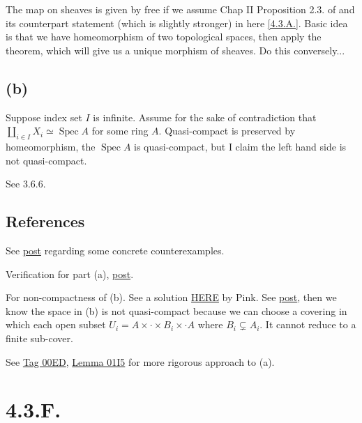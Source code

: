The map on sheaves is given by free if we assume Chap II Proposition 2.3. of \cite{hartshorne2013algebraic} and its counterpart statement (which is slightly stronger) in here \ref{4.3.A.}. Basic idea is that we have homeomorphism of two topological spaces, then apply the theorem, which will give us a unique morphism of sheaves. Do this conversely...

\subsection{(b)}

Suppose index set $I$ is infinite. Assume for the sake of contradiction that $\amalg_{i\in I}X_i\simeq \operatorname{Spec}A$ for some ring $A$. Quasi-compact is preserved by homeomorphism, the $\operatorname{Spec}A$ is quasi-compact, but I claim the left hand side is not quasi-compact. 

See 3.6.6.

\subsection{References}

See \href{https://math.stackexchange.com/questions/778440/spectrum-of-a-product-of-rings-isomorphic-to-the-product-of-the-spectra}{post} regarding some concrete counterexamples.

Verification for part (a), \href{https://math.stackexchange.com/questions/321018/why-is-the-disjoint-union-of-a-finite-number-of-affine-schemes-an-affine-scheme#:~:text=We%20know%20that%20the%20disjoint,space%20is%20not%20quasi%2Dcompact.}{post}.

For non-compactness of (b). See a solution \href{https://metaphor.ethz.ch/x/2017/fs/401-3146-12L/ex/SolSheet6.pdf}{HERE} by Pink. See \href{https://math.stackexchange.com/questions/3038162/proving-mathbbn-is-not-compact}{post}, then we know the space in (b) is not quasi-compact because we can choose a covering in which each open subset $U_i=A\times\cdot\times B_i\times \cdot A$ where $B_i\subsetneq A_i$. It cannot reduce to a finite sub-cover.

See \href{https://stacks.math.columbia.edu/tag/00ED}{Tag 00ED}, \href{https://stacks.math.columbia.edu/tag/01I5}{Lemma 01I5} for more rigorous approach to (a).

\section{4.3.F.}\label{4.3.F.}

